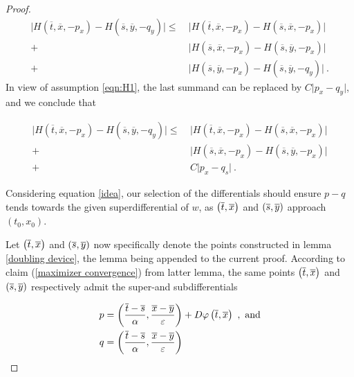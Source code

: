 \begin{theorem}
\begin{proof}
		  		\begin{equation*}
		  		\begin{split}
		  		\lvert H(\overline{t}, \overline{x}, -p_x) - H(\overline{s}, \overline{y}, -q_y) \rvert \leq \
		  		&\lvert H(\overline{t}, \overline{x}, -p_x) - H(\overline{s}, \overline{x}, -p_x) \rvert \\
		  		+&\lvert H(\overline{s}, \overline{x}, -p_x) - H(\overline{s}, \overline{y}, -p_x) \rvert \\
		  		+&\lvert H(\overline{s}, \overline{y}, -p_x) - H(\overline{s}, \overline{y}, -q_y) \rvert \ .
		  		\end{split} 
		  		\end{equation*}
		  		In view of assumption \eqref{eqn:H1}, the last summand can be replaced by $ C \lvert p_x - q_y \rvert $, and we conclude that
		  		
		  		\begin{equation}
		  		\label{idea}
		  		\begin{split}
		  		\lvert H(\overline{t}, \overline{x}, -p_x) - H(\overline{s}, \overline{y}, -q_y) \rvert \leq \
		  		&\lvert H(\overline{t}, \overline{x}, -p_x) - H(\overline{s}, \overline{x}, -p_x) \rvert \\
		  		+&\lvert H(\overline{s}, \overline{x}, -p_x) - H(\overline{s}, \overline{y}, -p_x) \rvert \\
		  		+& C \lvert p_x - q_s \rvert \ .
		  		\end{split}
		  		\end{equation}
		  		
		  		Considering equation \eqref{idea}, our selection of the differentials should ensure $ p - q $ tends towards the given superdifferential of $ w $, as $ \left(\overline{t}, \overline{x}\right) $ and $ \left(\overline{s}, \overline{y}\right) $ approach $ (t_0, x_0) $.
		  		
		  		Let $ \left(\overline{t}, \overline{x}\right) $ and $ \left(\overline{s}, \overline{y}\right) $ now specifically denote the points constructed in lemma \ref{doubling device}, the lemma being appended to the current proof. According to claim (\ref{maximizer convergence}) from latter lemma, the same points $ \left(\overline{t}, \overline{x}\right) $ and $ \left(\overline{s}, \overline{y}\right) $ respectively admit the super-and subdifferentials
		  		
		  		\begin{align*}
		  				p &= \left( \frac{\overline{t} - \overline{s}}{\alpha}, \frac{\overline{x} - \overline{y}}{\varepsilon} \right) + D\varphi\left(\overline{t}, \overline{x}\right) \ , \text{ and} \\
		  			q &= \left( \frac{\overline{t} - \overline{s}}{\alpha}, \frac{\overline{x} - \overline{y}}{\varepsilon} \right)
		  		\end{align*}
		  		

\end{proof}
\end{theorem}
